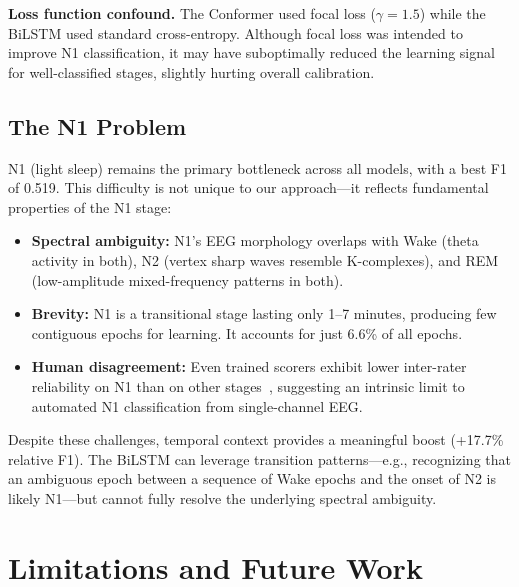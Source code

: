 \documentclass[final]{article}
\begin{document}
\textbf{Loss function confound.} The Conformer used focal loss ($\gamma = 1.5$) while the BiLSTM used standard cross-entropy. Although focal loss was intended to improve N1 classification, it may have suboptimally reduced the learning signal for well-classified stages, slightly hurting overall calibration.

\subsection{The N1 Problem}

N1 (light sleep) remains the primary bottleneck across all models, with a best F1 of 0.519. This difficulty is not unique to our approach---it reflects fundamental properties of the N1 stage:

\begin{itemize}[nosep, leftmargin=*]
  \item \textbf{Spectral ambiguity:} N1's EEG morphology overlaps with Wake (theta activity in both), N2 (vertex sharp waves resemble K-complexes), and REM (low-amplitude mixed-frequency patterns in both).
  \item \textbf{Brevity:} N1 is a transitional stage lasting only 1--7 minutes, producing few contiguous epochs for learning. It accounts for just 6.6\% of all epochs.
  \item \textbf{Human disagreement:} Even trained scorers exhibit lower inter-rater reliability on N1 than on other stages~\cite{Rosenberg2013}, suggesting an intrinsic limit to automated N1 classification from single-channel EEG.
\end{itemize}

Despite these challenges, temporal context provides a meaningful boost (+17.7\% relative F1). The BiLSTM can leverage transition patterns---e.g., recognizing that an ambiguous epoch between a sequence of Wake epochs and the onset of N2 is likely N1---but cannot fully resolve the underlying spectral ambiguity.

\section{Limitations and Future Work}
\end{document}
